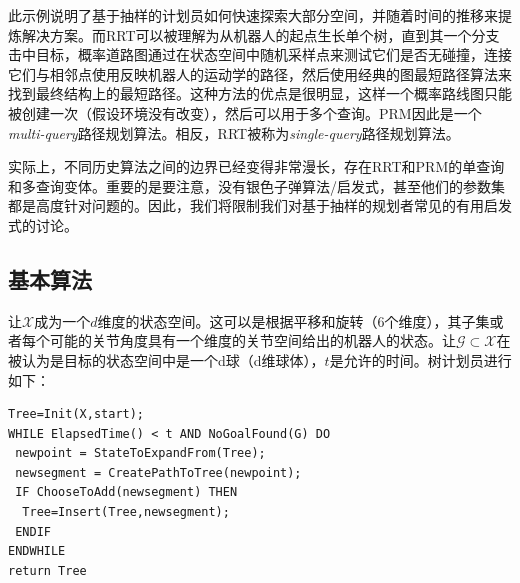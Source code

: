 此示例说明了基于抽样的计划员如何快速探索大部分空间，并随着时间的推移来提炼解决方案。而RRT可以被理解为从机器人的起点生长单个树，直到其一个分支击中目标，概率道路图通过在状态空间中随机采样点来测试它们是否无碰撞，连接它们与相邻点使用反映机器人的运动学的路径，然后使用经典的图最短路径算法来找到最终结构上的最短路径。这种方法的优点是很明显，这样一个概率路线图只能被创建一次（假设环境没有改变），然后可以用于多个查询。PRM因此是一个\emph{multi-query}路径规划算法。相反，RRT被称为\emph{single-query}路径规划算法。


实际上，不同历史算法之间的边界已经变得非常漫长，存在RRT和PRM的单查询和多查询变体。重要的是要注意，没有银色子弹算法/启发式，甚至他们的参数集都是高度针对问题的。因此，我们将限制我们对基于抽样的规划者常见的有用启发式的讨论。


\subsection{基本算法}

让$\mathcal{X}$成为一个$d$维度的状态空间。这可以是根据平移和旋转（6个维度），其子集或者每个可能的关节角度具有一个维度的关节空间给出的机器人的状态。让$\mathcal{G}\subset\mathcal{X}$在被认为是目标的状态空间中是一个d球（d维球体），$t$是允许的时间。树计划员进行如下：

\begin{verbatim}
Tree=Init(X,start);
WHILE ElapsedTime() < t AND NoGoalFound(G) DO
 newpoint = StateToExpandFrom(Tree);
 newsegment = CreatePathToTree(newpoint);
 IF ChooseToAdd(newsegment) THEN
  Tree=Insert(Tree,newsegment);
 ENDIF
ENDWHILE
return Tree
\end{verbatim}

